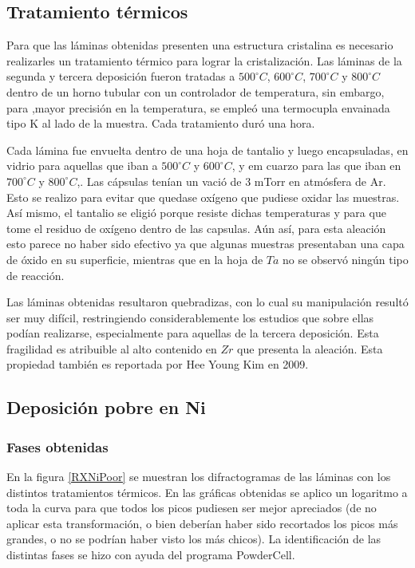 \documentclass[12pt]{article}
\theoremstyle{definition}
\theoremstyle{remark}
\begin{document}
{\subsection{Tratamiento térmicos}
Para que las láminas obtenidas presenten una estructura cristalina es necesario realizarles un tratamiento térmico para lograr la cristalización. Las láminas de la segunda y tercera deposición fueron tratadas a $500 ^\circ C$, $600 ^\circ C$, $700 ^\circ C$ y $800 ^\circ C$ dentro de un horno tubular con un controlador de temperatura, sin embargo, para ,mayor precisión en la temperatura, se empleó una termocupla envainada tipo K al lado de la muestra. Cada tratamiento duró una hora.

Cada lámina fue envuelta dentro de una hoja de tantalio y luego encapsuladas, en vidrio para aquellas que iban a $500 ^\circ C$ y $600 ^\circ C$, y em cuarzo para las que iban en $700 ^\circ C$ y $800 ^\circ C$,. Las cápsulas tenían un vació de 3 mTorr en atmósfera de Ar. Esto se realizo para evitar que quedase oxígeno que pudiese oxidar las muestras. Así mismo, el tantalio se eligió porque resiste dichas temperaturas y para que tome el residuo de oxígeno dentro de las capsulas. Aún así, para esta aleación esto parece no haber sido efectivo ya que algunas muestras presentaban una capa de óxido en su superficie, mientras que en la hoja de $Ta$ no se observó ningún tipo de reacción.

Las láminas obtenidas resultaron quebradizas, con lo cual su manipulación resultó ser muy difícil, restringiendo considerablemente los estudios que sobre ellas podían realizarse, especialmente para aquellas de la tercera deposición. Esta fragilidad es atribuible al alto contenido en $Zr$ que presenta la aleación. Esta propiedad también es reportada por Hee Young Kim en 2009\cite{HeeYoungKim2009}.


\subsection{Deposición pobre en Ni}
\subsubsection{Fases obtenidas}
En la figura \ref{RXNiPoor} se muestran los difractogramas de las láminas con los distintos tratamientos térmicos. En las gráficas obtenidas se aplico un logaritmo a toda la curva para que todos los picos pudiesen ser mejor apreciados (de no aplicar esta transformación, o bien deberían haber sido recortados los picos más grandes, o no se podrían haber visto los más chicos). La identificación de las distintas fases se hizo con ayuda del programa PowderCell.

}
\end{document}
